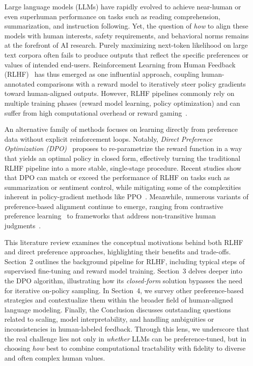 \documentclass[a4paper,oneside,10pt,ngerman,english]{scrartcl}
\begin{document}
Large language models (LLMs) have rapidly evolved to achieve near-human or even superhuman
performance on tasks such as reading comprehension, summarization, and instruction following. Yet,
the question of \emph{how} to align these models with human interests, safety requirements, and
behavioral norms remains at the forefront of AI research. Purely maximizing next-token likelihood
on large text corpora often fails to produce outputs that reflect the specific preferences or values
of intended end-users. Reinforcement Learning from Human Feedback (RLHF)~\cite{bib:Christiano2017}
has thus emerged as one influential approach, coupling human-annotated comparisons with a reward
model to iteratively steer policy gradients toward human-aligned outputs. However, RLHF pipelines
commonly rely on multiple training phases (reward model learning, policy optimization) and can
suffer from high computational overhead or reward gaming~\cite{bib:Gao2023}.

An alternative family of methods focuses on learning directly from preference data without explicit
reinforcement loops. Notably, \emph{Direct Preference Optimization (DPO)}~\cite{bib:Rafailov2023}
proposes to re-parametrize the reward function in a way that yields an optimal policy in closed form,
effectively turning the traditional RLHF pipeline into a more stable, single-stage procedure. Recent
studies show that DPO can match or exceed the performance of RLHF on tasks such as summarization
or sentiment control, while mitigating some of the complexities inherent in policy-gradient methods
like PPO~\cite{bib:Schulman2017}. Meanwhile, numerous variants of preference-based alignment
continue to emerge, ranging from contrastive preference learning~\cite{bib:Zhao2023} to frameworks
that address non-transitive human judgments~\cite{bib:Tversky1969}.

This literature review examines the conceptual motivations behind both RLHF and direct preference
approaches, highlighting their benefits and trade-offs. Section~2 outlines the background pipeline
for RLHF, including typical steps of supervised fine-tuning and reward model training. Section~3
delves deeper into the DPO algorithm, illustrating how its \emph{closed-form} solution bypasses the
need for iterative on-policy sampling. In Section~4, we survey other preference-based strategies and
contextualize them within the broader field of human-aligned language modeling. Finally, the
Conclusion discusses outstanding questions related to scaling, model interpretability, and handling
ambiguities or inconsistencies in human-labeled feedback. Through this lens, we underscore that the
real challenge lies not only in \emph{whether} LLMs can be preference-tuned, but in choosing \emph{how}
best to combine computational tractability with fidelity to diverse and often complex human values.
\end{document}
